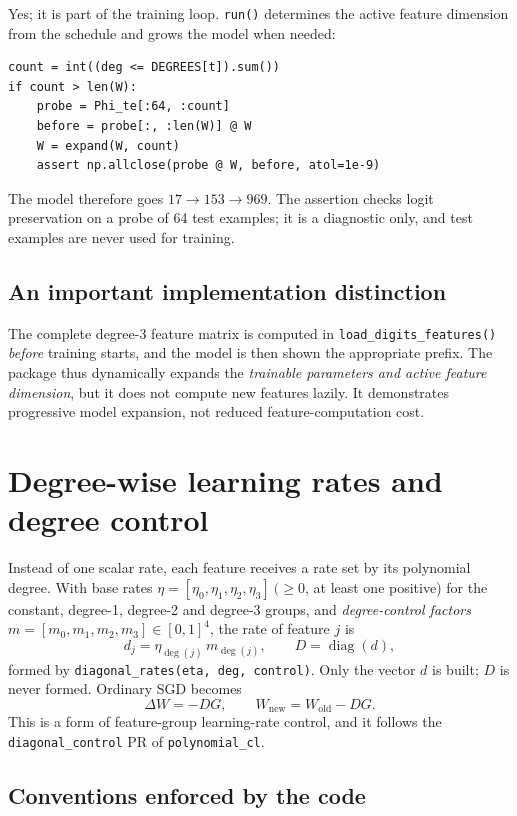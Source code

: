 \documentclass[11pt,a4paper]{article}
\DeclareMathOperator{\diag}{diag}
\newcommand{\code}[1]{\texttt{#1}}
\begin{document}
Yes; it is part of the training loop. \code{run()} determines the active feature dimension from the schedule and grows the model when needed:
\begin{lstlisting}
count = int((deg <= DEGREES[t]).sum())
if count > len(W):
    probe = Phi_te[:64, :count]
    before = probe[:, :len(W)] @ W
    W = expand(W, count)
    assert np.allclose(probe @ W, before, atol=1e-9)
\end{lstlisting}
The model therefore goes $17\to153\to969$. The assertion checks logit preservation on a probe of 64 test examples; it is a diagnostic only, and test examples are never used for training.

\subsection{An important implementation distinction}

The complete degree-3 feature matrix is computed in \code{load\_digits\_features()} \emph{before} training starts, and the model is then shown the appropriate prefix. The package thus dynamically expands the \emph{trainable parameters and active feature dimension}, but it does not compute new features lazily. It demonstrates progressive model expansion, not reduced feature-computation cost.

\section{Degree-wise learning rates and degree control}

Instead of one scalar rate, each feature receives a rate set by its polynomial degree. With base rates $\eta=[\eta_0,\eta_1,\eta_2,\eta_3]\ (\ge0$, at least one positive) for the constant, degree-1, degree-2 and degree-3 groups, and \emph{degree-control factors} $m=[m_0,m_1,m_2,m_3]\in[0,1]^4$, the rate of feature $j$ is
\[
\boxed{d_j=\eta_{\deg(j)}\,m_{\deg(j)}},\qquad D=\diag(d),
\]
formed by \code{diagonal\_rates(eta, deg, control)}. Only the vector $d$ is built; $D$ is never formed. Ordinary SGD becomes
\[
\boxed{\Delta W=-DG},\qquad W_{\text{new}}=W_{\text{old}}-DG.
\]
This is a form of feature-group learning-rate control, and it follows the \code{diagonal\_control} PR of \code{polynomial\_cl}.

\subsection{Conventions enforced by the code}
\end{document}
